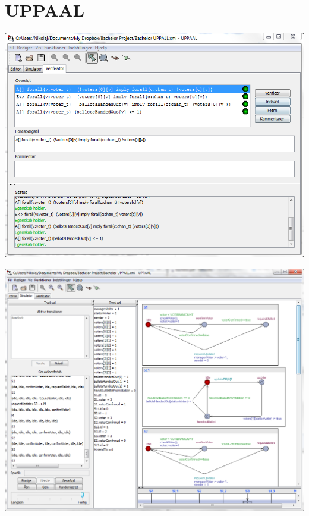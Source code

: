 \documentclass[a4paper]{report}
\begin{document}
\section{UPPAAL}
\label{sec:uppaal}
\begin{center}
\includegraphics[width=\textwidth]{UPPAAL1.png}
\end{center}
\begin{center}
\includegraphics[width=\textwidth]{UPPAAL2.png}
\end{center}
\end{document}
